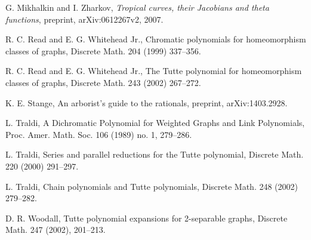 \documentclass{amsart}
\theoremstyle{definition}
\begin{document}
\begin{thebibliography}{99}
G. Mikhalkin and I. Zharkov,
\textit{Tropical curves, their Jacobians and theta functions},
preprint, arXiv:0612267v2,
2007.

R. C. Read and E. G. Whitehead Jr.,
{Chromatic polynomials for homeomorphism classes of graphs},
Discrete Math. {204} (1999)
337--356.

R. C. Read and E. G. Whitehead Jr.,
{The Tutte polynomial for homeomorphism classes of graphs},
Discrete Math. {243} (2002)
267--272.

K. E. Stange,
{An arborist's guide to the rationals},
preprint,
arXiv:1403.2928.

L. Traldi,
{A Dichromatic Polynomial for Weighted Graphs and Link Polynomials},
Proc. Amer. Math. Soc. {106} (1989)
no. 1, 279--286.

L. Traldi,
{Series and parallel reductions for the Tutte polynomial},
Discrete Math. {220} (2000)
291--297.

L. Traldi,
{Chain polynomials and Tutte polynomials},
Discrete Math. {248} (2002)
279--282.

D. R. Woodall,
{Tutte polynomial expansions for 2-separable graphs},
Discrete Math. {247} (2002),
201--213.

\end{thebibliography}
\end{document}
